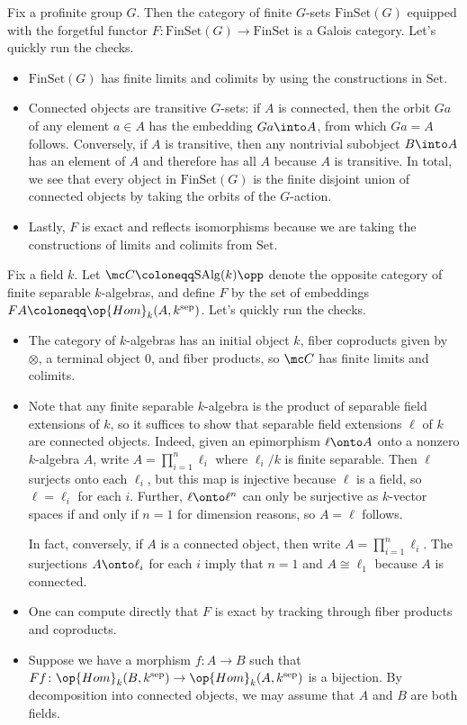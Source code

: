 \documentclass{amsart}
\begin{document}
\begin{example} \label{ex:g-sets}
    Fix a profinite group $G$. Then the category of finite $G$-sets $\mathrm{FinSet}(G)$ equipped with the forgetful functor $F\colon\mathrm{FinSet}(G)\to\mathrm{FinSet}$ is a Galois category. Let's quickly run the checks.
    \begin{itemize}
        \item $\mathrm{FinSet}(G)$ has finite limits and colimits by using the constructions in $\mathrm{Set}$.
        \item Connected objects are transitive $G$-sets: if $A$ is connected, then the orbit $Ga$ of any element $a\in A$ has the embedding $Ga\into A$, from which $Ga=A$ follows. Conversely, if $A$ is transitive, then any nontrivial subobject $B\into A$ has an element of $A$ and therefore has all $A$ because $A$ is transitive. In total, we see that every object in $\mathrm{FinSet}(G)$ is the finite disjoint union of connected objects by taking the orbits of the $G$-action.
        \item Lastly, $F$ is exact and reflects isomorphisms because we are taking the constructions of limits and colimits from $\mathrm{Set}$.
    \end{itemize}
\end{example}
\begin{example} \label{ex:salgk}
    Fix a field $k$. Let $\mc C\coloneqq\mathrm{SAlg}(k)\opp$ denote the opposite category of finite separable $k$-algebras, and define $F$ by the set of embeddings $FA\coloneqq\op{Hom}_k(A,k^{\mathrm{sep}})$. Let's quickly run the checks.
    \begin{itemize}
        \item The category of $k$-algebras has an initial object $k$, fiber coproducts given by $\otimes$, a terminal object $0$, and fiber products, so $\mc C$ has finite limits and colimits.
        \item Note that any finite separable $k$-algebra is the product of separable field extensions of $k$, so it suffices to show that separable field extensions $\ell$ of $k$ are connected objects. Indeed, given an epimorphism $\ell\onto A$ onto a nonzero $k$-algebra $A$, write $A=\prod_{i=1}^n\ell_i$ where $\ell_i/k$ is finite separable. Then $\ell$ surjects onto each $\ell_i$, but this map is injective because $\ell$ is a field, so $\ell=\ell_i$ for each $i$. Further, $\ell\onto\ell^n$ can only be surjective as $k$-vector spaces if and only if $n=1$ for dimension reasons, so $A=\ell$ follows.

        In fact, conversely, if $A$ is a connected object, then write $A=\prod_{i=1}^n\ell_i$. The surjections $A\onto\ell_i$ for each $i$ imply that $n=1$ and $A\cong\ell_1$ because $A$ is connected.
        \item One can compute directly that $F$ is exact by tracking through fiber products and coproducts.
        \item Suppose we have a morphism $f\colon A\to B$ such that $Ff\colon\op{Hom}_k(B,k^{\mathrm{sep}})\to\op{Hom}_k(A,k^{\mathrm{sep}})$ is a bijection. By decomposition into connected objects, we may assume that $A$ and $B$ are both fields.
    \end{itemize}
\end{example}
\end{document}
